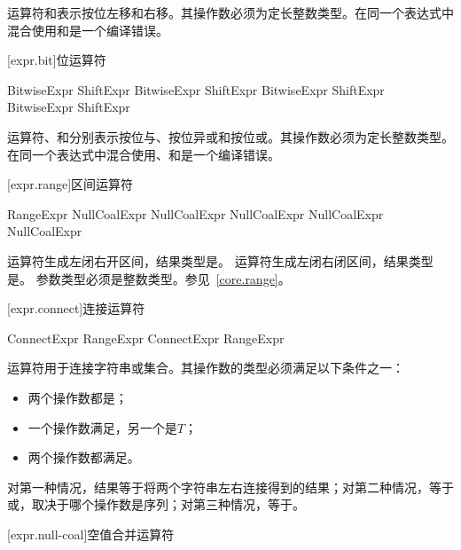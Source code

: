 \pnum
运算符和表示按位左移和右移。其操作数必须为定长整数类型。在同一个表达式中混合使用和是一个编译错误。

[expr.bit]{位运算符}

\begin{bnf}{BitwiseExpr}
    ShiftExpr \br
    BitwiseExpr  ShiftExpr \br
    BitwiseExpr  ShiftExpr \br
    BitwiseExpr  ShiftExpr
\end{bnf}

\pnum
运算符、和分别表示按位与、按位异或和按位或。其操作数必须为定长整数类型。在同一个表达式中混合使用、和是一个编译错误。

[expr.range]{区间运算符}

\begin{bnf}{RangeExpr}
    NullCoalExpr \br
    NullCoalExpr  NullCoalExpr \br
    NullCoalExpr  NullCoalExpr
\end{bnf}

\pnum
运算符生成左闭右开区间，结果类型是。
运算符生成左闭右闭区间，结果类型是。
参数类型必须是整数类型。参见~\ref{core.range}。

[expr.connect]{连接运算符}

\begin{bnf}{ConnectExpr}
    RangeExpr \br
    ConnectExpr \terminal{\~} RangeExpr
\end{bnf}

\pnum
运算符\tcode{\~}用于连接字符串或集合。其操作数的类型必须满足以下条件之一：

\begin{itemize}
    \item 两个操作数都是；
    \item 一个操作数满足，另一个是$T$；
    \item 两个操作数都满足。
\end{itemize}

对第一种情况，结果等于将两个字符串左右连接得到的结果；对第二种情况，等于\tcode{[$x$, ...$y$]}或\tcode{[...$x$, $y$]}，取决于哪个操作数是序列；对第三种情况，等于\tcode{[...$x$, ...$y$]}。

[expr.null-coal]{空值合并运算符}

